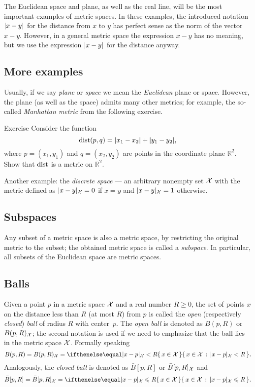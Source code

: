 The Euclidean space and plane, as well as the real line, will be the most important examples of metric spaces.
In these examples, the introduced notation $\dist{x}{y}{}$ for the distance from $x$ to $y$ has perfect sense as the norm of the vector $x-y$.
However, in a general metric space the expression $x-y$ has no meaning, but we use the expression $\dist{x}{y}{}$ for the distance anyway.

\subsection*{More examples}

Usually, if we say {}\emph{plane} or {}\emph{space} we mean the {}\emph{Euclidean} plane or space.
However, the plane (as well as the space) admits many other metrics; for example, the so-called {}\emph{Manhattan metric} from the following exercise.

\begin{thm}{Exercise}\label{ex:ell-infty}
Consider the function
$$\mathop{\rm dist}\nolimits(p,q)=|x_1-x_2|+|y_1-y_2|,$$
where $p=(x_1,y_1)$ and $q=(x_2,y_2)$ are points in the coordinate plane $\mathbb{R}^2$.
Show that $\mathop{\rm dist}\nolimits$ is a metric on $\mathbb{R}^2$.
\end{thm}

Another example: the {}\emph{discrete space} --- an arbitrary nonempty set $\mathcal{X}$ with the metric defined as $\dist{x}{y}{\spc{X}}=0$ if $x=y$ and $\dist{x}{y}{\spc{X}}=1$ otherwise.

\subsection*{Subspaces}
Any subset of a metric space is also a metric space, by restricting the original metric to the subset;
the obtained metric space is called a {}\emph{subspace}.
In particular, all subsets of the Euclidean space are metric spaces.

\subsection*{Balls}
Given a point $p$ in a metric space $\mathcal{X}$ and a real number $R\ge 0$, the set of points $x$ on the distance less than $R$ (at most $R$) from $p$ is called the \emph{open} (respectively \emph{closed}) {}\emph{ball} of radius $R$ with center~$p$.
The {}\emph{open ball} is denoted as $B(p,R)$ or $B(p,R)_{\mathcal{X}}$;
the second notation is used if we need to emphasize that the ball lies in the metric space $\mathcal{X}$.
Formally speaking
\[B(p,R)=B(p,R)_{\spc{X}}=\set{x\in \spc{X}}{\dist{x}{p}{\spc{X}}< R}.\]
Analogously, the {}\emph{closed ball} is denoted as $\bar B[p,R]$ or $\bar B[p,R]_{\mathcal{X}}$ and
\[\bar B[p,R]=\bar B[p,R]_{\spc{X}}=\set{x\in \spc{X}}{\dist{x}{p}{\spc{X}}\le R}.\]

